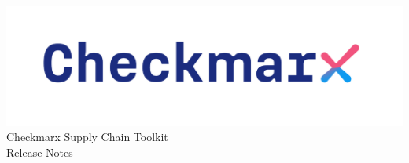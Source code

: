 \documentclass[a4paper, 11pt, oneside]{book}
\begin{document}
\begin{center}
    \includegraphics[scale=.5]{../docs/graphics/cx_logo-dark.png}
    \Huge{Checkmarx Supply Chain Toolkit\\Release Notes}
\end{center}


\end{document}
